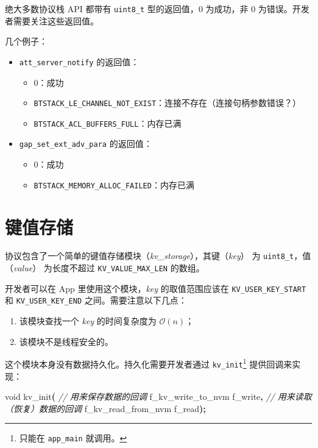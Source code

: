 \documentclass[
  12pt,
]{book}
\newenvironment{Shaded}{\begin{snugshade}}{\end{snugshade}}
\newcommand{\CommentTok}[1]{\textcolor[rgb]{0.56,0.35,0.01}{\textit{#1}}}
\newcommand{\DataTypeTok}[1]{\textcolor[rgb]{0.13,0.29,0.53}{#1}}
\newcommand{\NormalTok}[1]{#1}
\newcommand{\OperatorTok}[1]{\textcolor[rgb]{0.81,0.36,0.00}{\textbf{#1}}}
\providecommand{\tightlist}{%
  \setlength{\itemsep}{0pt}\setlength{\parskip}{0pt}}
\begin{document}
绝大多数协议栈 API 都带有 \texttt{uint8\_t} 型的返回值，\(0\) 为成功，非 \(0\) 为错误。开发者需要关注这些返回值。

几个例子：

\begin{itemize}
\item
  \texttt{att\_server\_notify} 的返回值：

  \begin{itemize}
  \tightlist
  \item
    \(0\)：成功
  \item
    \texttt{BTSTACK\_LE\_CHANNEL\_NOT\_EXIST}：连接不存在（连接句柄参数错误？）
  \item
    \texttt{BTSTACK\_ACL\_BUFFERS\_FULL}：内存已满
  \end{itemize}
\item
  \texttt{gap\_set\_ext\_adv\_para} 的返回值：

  \begin{itemize}
  \tightlist
  \item
    \(0\)：成功
  \item
    \texttt{BTSTACK\_MEMORY\_ALLOC\_FAILED}：内存已满
  \end{itemize}
\end{itemize}

\hypertarget{ux952eux503cux5b58ux50a8}{%
\section{键值存储}\label{ux952eux503cux5b58ux50a8}}

协议包含了一个简单的键值存储模块（\emph{kv\_storage}），其键（\emph{key}） 为 \texttt{uint8\_t}，值（\emph{value}） 为长度不超过 \texttt{KV\_VALUE\_MAX\_LEN}
的数组。

开发者可以在 App 里使用这个模块，\emph{key} 的取值范围应该在 \texttt{KV\_USER\_KEY\_START} 和 \texttt{KV\_USER\_KEY\_END} 之间。需要注意以下几点：

\begin{enumerate}
\def\labelenumi{\arabic{enumi}.}
\tightlist
\item
  该模块查找一个 \emph{key} 的时间复杂度为 \(\mathcal{O}(n)\)；
\item
  该模块不是线程安全的。
\end{enumerate}

这个模块本身没有数据持久化。持久化需要开发者通过 \texttt{kv\_init}\footnote{只能在 \texttt{app\_main} 就调用。} 提供回调来实现：

\begin{Shaded}
\begin{Highlighting}[]
\DataTypeTok{void}\NormalTok{ kv\_init}\OperatorTok{(}
  \CommentTok{// 用来保存数据的回调}
\NormalTok{  f\_kv\_write\_to\_nvm f\_write}\OperatorTok{,}
  \CommentTok{// 用来读取（恢复）数据的回调}
\NormalTok{  f\_kv\_read\_from\_nvm f\_read}\OperatorTok{);}
\end{Highlighting}
\end{Shaded}
\end{document}
